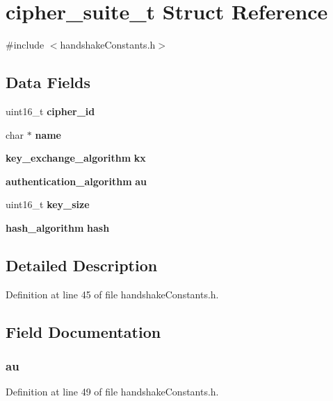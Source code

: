 \section{cipher\+\_\+suite\+\_\+t Struct Reference}
\label{structcipher__suite__t}


{\ttfamily \#include $<$handshake\+Constants.\+h$>$}

\subsection*{Data Fields}
\begin{DoxyCompactItemize}
\item 
uint16\+\_\+t {\bf cipher\+\_\+id}
\item 
char $\ast$ {\bf name}
\item 
{\bf key\+\_\+exchange\+\_\+algorithm} {\bf kx}
\item 
{\bf authentication\+\_\+algorithm} {\bf au}
\item 
uint16\+\_\+t {\bf key\+\_\+size}
\item 
{\bf hash\+\_\+algorithm} {\bf hash}
\end{DoxyCompactItemize}


\subsection{Detailed Description}


Definition at line 45 of file handshake\+Constants.\+h.



\subsection{Field Documentation}
\subsubsection[{au}]{ au}\label{structcipher__suite__t_a37e1ecaa52b55ec9e6f0a07042aa8da8}


Definition at line 49 of file handshake\+Constants.\+h.

